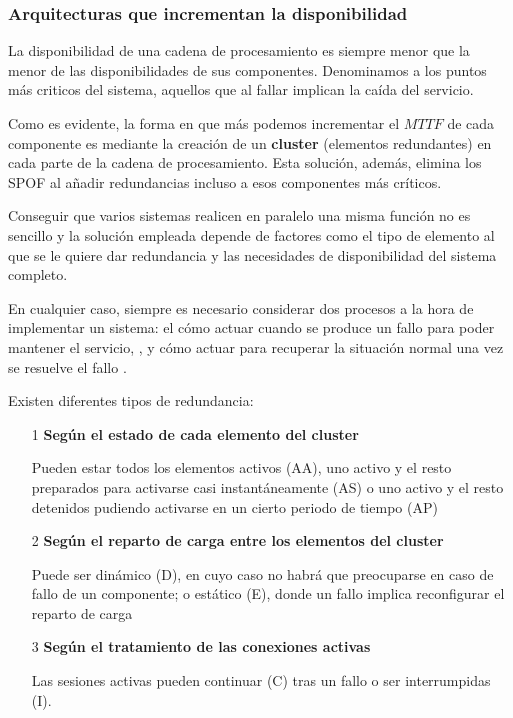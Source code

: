 \subsubsection{Arquitecturas que incrementan la disponibilidad}

La disponibilidad de una cadena de procesamiento es siempre menor que la menor de las disponibilidades de sus componentes. Denominamos  a los puntos más criticos del sistema, aquellos que al fallar implican la caída del servicio.

Como es evidente, la forma en que más podemos incrementar el $MTTF$ de cada componente es mediante la creación de un \textbf{cluster} (elementos redundantes) en cada parte de la cadena de procesamiento. Esta solución, además, elimina los SPOF al añadir redundancias incluso a esos componentes más críticos.

Conseguir que varios sistemas realicen en paralelo una misma función no es sencillo y la solución empleada depende de factores como el tipo de elemento al que se le quiere dar redundancia y las necesidades de disponibilidad del sistema completo.

En cualquier caso, siempre es necesario considerar dos procesos a la hora de implementar un sistema: el cómo actuar cuando se produce un fallo para poder mantener el servicio, , y cómo actuar para recuperar la situación normal una vez se resuelve el fallo .

\newpage
Existen diferentes tipos de redundancia:
\begin{enumerate}
\item[1] \textbf{Según el estado de cada elemento del cluster}

Pueden estar todos los elementos activos (AA), uno activo y el resto preparados para activarse casi instantáneamente (AS) o uno activo y el resto detenidos pudiendo activarse en un cierto periodo de tiempo (AP)

\item[2] \textbf{Según el reparto de carga entre los elementos del cluster}

Puede ser dinámico (D), en cuyo caso no habrá que preocuparse en caso de fallo de un componente; o estático (E), donde un fallo implica reconfigurar el reparto de carga

\item[3] \textbf{Según el tratamiento de las conexiones activas}

Las sesiones activas pueden continuar (C) tras un fallo o ser interrumpidas (I).
\end{enumerate}

